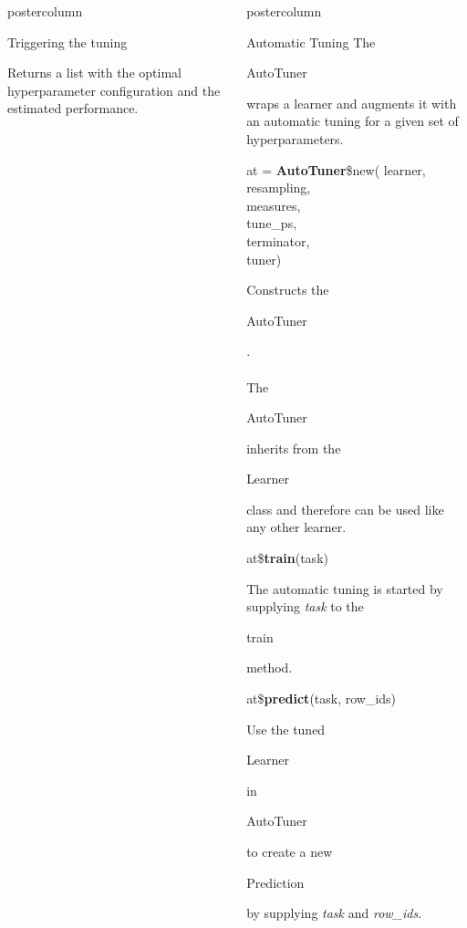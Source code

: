 \documentclass{beamer}
\newlength{\columnheight} %
\newcommand{\codeinline}[1]{\begin{codeboxinline}#1\end{codeboxinline}}
\begin{document}
\begin{frame}[fragile]{}
\begin{columns}
\begin{column}{.245\textwidth}
\begin{beamercolorbox}[center]{postercolumn}
\begin{minipage}{.98\textwidth}
{\begin{myblock}{Triggering the tuning}
\begin{codebox}
							\end{codebox}
							Returns a list with the optimal hyperparameter configuration and the estimated performance.
						\end{myblock}
						\vfill}
				\end{minipage}
			\end{beamercolorbox}
		\end{column}
		\begin{column}{.245\textwidth}
			\begin{beamercolorbox}[center]{postercolumn}
				\begin{minipage}{.98\textwidth}
					\parbox[t][\columnheight]{\textwidth}{
						\begin{myblock}{Automatic Tuning}
							The \codeinline{AutoTuner} wraps a learner and augments it with an automatic tuning for a given set of hyperparameters.
							\\
							\begin{codeboxmultiline}[width=18cm]
								at = \textbf{AutoTuner}\$new(
								\hspace*{1ex}learner,\\
								\hspace*{1ex}resampling,\\
								\hspace*{1ex}measures,\\
								\hspace*{1ex}tune\_ps,\\
								\hspace*{1ex}terminator,\\
								\hspace*{1ex}tuner)
							\end{codeboxmultiline}
							Constructs the \codeinline{AutoTuner}.
							\\
							\\
							The \codeinline{AutoTuner} inherits from the \codeinline{Learner} class and therefore can be used like any other learner.
							\\
							\begin{codebox}
								at\$\textbf{train}(task)
							\end{codebox}
							The automatic tuning is started by supplying \textit{task} to the \codeinline{train} method.
							\\
							\begin{codebox}
								at\$\textbf{predict}(task, row\_ids)
							\end{codebox}
							Use the tuned \codeinline{Learner} in \codeinline{AutoTuner} to create a new \codeinline{Prediction} by supplying \textit{task} and \textit{row\_ids}.
							\\
						\end{myblock}
						\vfill}
				\end{minipage}
			\end{beamercolorbox}
		\end{column}
	\end{columns}
\end{frame}
\end{document}
